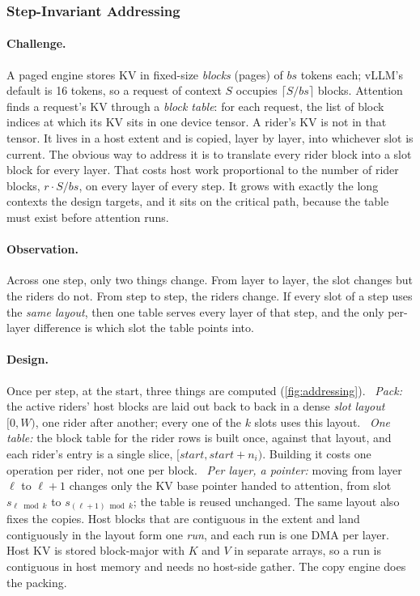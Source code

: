\subsubsection{Step-Invariant Addressing}\label{sec:addressing}



\paragraph{Challenge.} A paged engine stores KV in fixed-size \emph{blocks}
(pages) of $\mathit{bs}$ tokens each; vLLM's default is 16 tokens, so a request
of context $S$ occupies $\lceil S/\mathit{bs}\rceil$ blocks. Attention finds a
request's KV through a \emph{block table}: for each request, the list of block
indices at which its KV sits in one device tensor. A rider's KV is not in that tensor. It lives in a host extent and
is copied, layer by layer, into whichever slot is current. The obvious way to
address it is to translate every rider block into a slot block for every layer.
That costs host work proportional to the number of rider blocks,
$r \cdot S/\mathit{bs}$, on every layer of every step. It grows with exactly the
long contexts the design targets, and it sits on the critical path, because the
table must exist before attention runs.

\paragraph{Observation.} Across one step, only two things change. From layer to
layer, the slot changes but the riders do not. From step to step, the riders
change. If every slot of a step uses the \emph{same layout}, then one table
serves every layer of that step, and the only per-layer difference is which slot
the table points into.

\paragraph{Design.} Once per step, at the start, three things are computed
(\cref{fig:addressing}). ~\emph{Pack:} the active riders' host blocks
are laid out back to back in a dense \emph{slot layout} $[0,W)$, one rider after
another; every one of the $k$ slots uses this layout. ~\emph{One table:}
the block table for the rider rows is built once, against that layout, and each
rider's entry is a single slice, $[\mathit{start}, \mathit{start}+n_i)$. Building
it costs one operation per rider, not one per block. ~\emph{Per layer, a
pointer:} moving from layer $\ell$ to $\ell{+}1$ changes only the KV base pointer
handed to attention, from slot $s_{\ell \bmod k}$ to $s_{(\ell+1) \bmod k}$; the
table is reused unchanged. The same layout also fixes the copies. Host blocks
that are contiguous in the extent and land contiguously in the layout form one
\emph{run}, and each run is one DMA per layer. Host KV is stored block-major
with $K$ and $V$ in separate arrays, so a run is contiguous in host memory and
needs no host-side gather. The copy engine does the packing.

